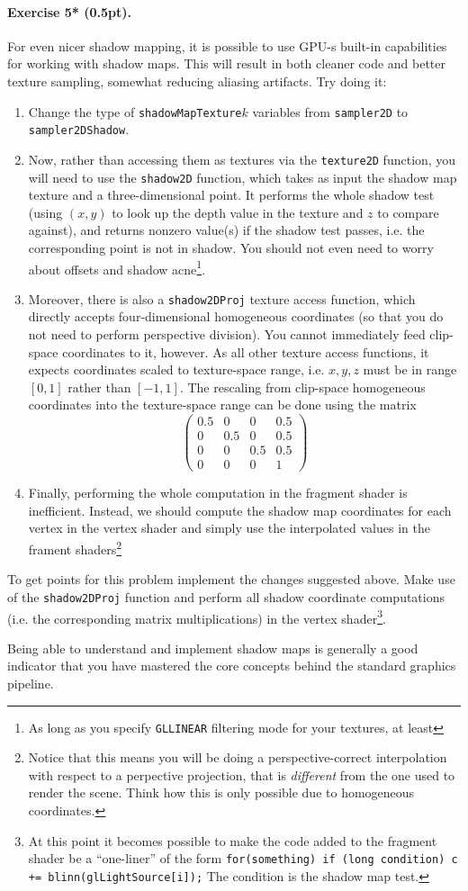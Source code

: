 \documentclass{article}
\newenvironment{exercise}[2]{\paragraph{Exercise #1 (#2pt).} }{
\medskip}
\begin{document}
\begin{exercise}{5*}{0.5}
For even nicer shadow mapping, it is possible to use GPU-s built-in capabilities for working with shadow maps. This will result in both cleaner code and better texture sampling, somewhat reducing aliasing artifacts. Try doing it:
\begin{enumerate}
\item Change the type of \texttt{shadowMapTexture}$k$ variables from \texttt{sampler2D} to \texttt{sampler2DShadow}.
\item Now, rather than accessing them as textures via the \texttt{texture2D} function, you will need to use the \texttt{shadow2D} function, which takes as input the shadow map texture and a three-dimensional point. It performs the whole shadow test (using $(x, y)$ to look up the depth value in the texture and $z$ to compare against), and returns nonzero value(s) if the shadow test passes, i.e. the corresponding point is not in shadow. You should not even need to worry about offsets and shadow acne\footnote{As long as you specify \texttt{GL\textunderscore LINEAR} filtering mode for your textures, at least}.
\item Moreover, there is also a \texttt{shadow2DProj} texture access function, which directly accepts four-dimensional homogeneous coordinates (so that you do not need to perform perspective division). You cannot immediately feed clip-space coordinates to it, however. As all other texture access functions, it expects coordinates scaled to texture-space range, i.e. $x, y, z$ must be in range $[0, 1]$ rather than $[-1, 1]$. The rescaling from clip-space homogeneous coordinates into the texture-space range can be done using the matrix
$$
\left(\begin{matrix}0.5 & 0 & 0 & 0.5\\
0 & 0.5 & 0 & 0.5 \\
0 & 0 & 0.5 & 0.5 \\
0 & 0& 0& 1\end{matrix}\right)
$$
\item Finally, performing the whole computation in the fragment shader is inefficient. Instead, we should compute the shadow map coordinates for each vertex in the vertex shader and simply use the interpolated values in the frament shaders\footnote{Notice that this means you will be doing a perspective-correct interpolation with respect to a perpective projection, that is \emph{different} from the one used to render the scene. Think how this is only possible due to homogeneous coordinates.}
\end{enumerate}
To get points for this problem implement the changes suggested above. Make use of the \texttt{shadow2DProj} function and perform all shadow coordinate computations (i.e. the corresponding matrix multiplications) in the vertex shader\footnote{At this point it becomes possible to make the code added to the fragment shader be a ``one-liner'' of the form \texttt{for(something) if (long condition) c += blinn(gl\textunderscore LightSource[i]);} The condition is the shadow map test.}.
\end{exercise}

Being able to understand and implement shadow maps is generally a good indicator that you have mastered the core concepts behind the standard graphics pipeline.
\end{document}
